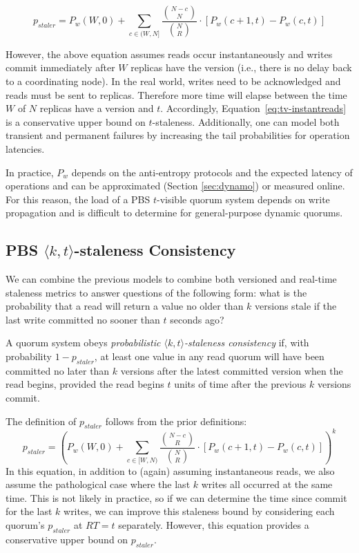 \documentclass{vldb}
\begin{document}
\begin{equation}
\label{eq:tv-instantreads}
p_{staler} = P_w(W, 0)+\sum_{c\in(W, N]} \frac{{N-c \choose N}}{{N \choose R}}\cdot [P_w(c+1, t)-P_w(c,t)]
\end{equation}

However, the above equation assumes reads occur instantaneously and
writes commit immediately after $W$ replicas have the version (i.e.,
there is no delay back to a coordinating node).  In the real world,
writes need to be acknowledged and reads must be sent to replicas.
Therefore more time will elapse between the time $W$ of $N$ replicas
have a version and $t$.  Accordingly,
Equation~\ref{eq:tv-instantreads} is a conservative upper bound on
$t$-staleness.  Additionally, one can model both transient and
permanent failures by increasing the tail probabilities for operation
latencies.

In practice, $P_w$ depends on the anti-entropy protocols and the
expected latency of operations and can be approximated (Section
\ref{sec:dynamo}) or measured online.  For this reason, the load of a
PBS $t$-visible quorum system depends on write propagation and is
difficult to determine for general-purpose dynamic quorums.


\subsection{PBS $\langle k, t
  \rangle$-staleness Consistency}

We can combine the previous models to combine both versioned and
real-time staleness metrics to answer questions of the following form:
what is the probability that a read will return a value no older than
$k$ versions stale if the last write committed no sooner than $t$ seconds
ago?
\begin{definition}
A quorum system obeys \textit{probabilistic $\langle k, t
  \rangle$-staleness consistency} if, with probability $1-p_{staler}$, at
least one value in any read quorum will have been committed no later
than $k$ versions after the latest committed version when the read
begins, provided the read begins $t$ units of time after the previous
$k$ versions commit.
\end{definition}
The definition of $p_{staler}$ follows from the prior definitions:
\begin{equation}
p_{staler} = (P_w(W, 0)+\sum_{c\in[W, N)} \frac{{N-c \choose R}}{{N \choose R}} \cdot [P_w(c+1, t)-P_w(c,t)])^k
\end{equation}
In this equation, in addition to (again) assuming instantaneous reads,
we also assume the pathological case where the last $k$ writes all
occurred at the same time.  This is not likely in practice, so if we
can determine the time since commit for the last $k$ writes, we can
improve this staleness bound by considering each quorum's $p_{staler}$
at $RT=t$ separately.  However, this equation provides a conservative
upper bound on $p_{staler}$.
\end{document}
